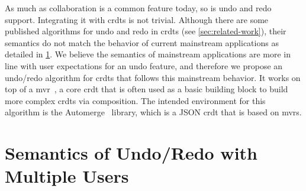 \documentclass[sigplan,natbib=false,review]{acmart}
\begin{document}
As much as collaboration is a common feature today, so is undo and redo support.
Integrating it with \glspl*{crdt} is not trivial.
Although there are some published algorithms for undo and redo in \glspl*{crdt}
(see \cref{sec:related-work}),
their semantics do not match the behavior of current mainstream applications
as detailed in \cref{sec:semantics}.
We believe the semantics of mainstream applications are more in line with
user expectations for an undo feature, and therefore we propose an undo/redo
algorithm for \glspl{crdt} that follows this mainstream behavior.
It works on top of a \gls*{mvr}~\cite{shapiro2011comprehensive},
a core \gls*{crdt} that is often used as a basic
building block to build more complex \glspl*{crdt} via composition.
The intended environment for this algorithm is the Automerge~\cite{automerge} library,
which is a JSON \gls*{crdt} that is based on \glspl*{mvr}.

\section{Semantics of Undo/Redo with Multiple Users}\label{sec:semantics}
\end{document}
